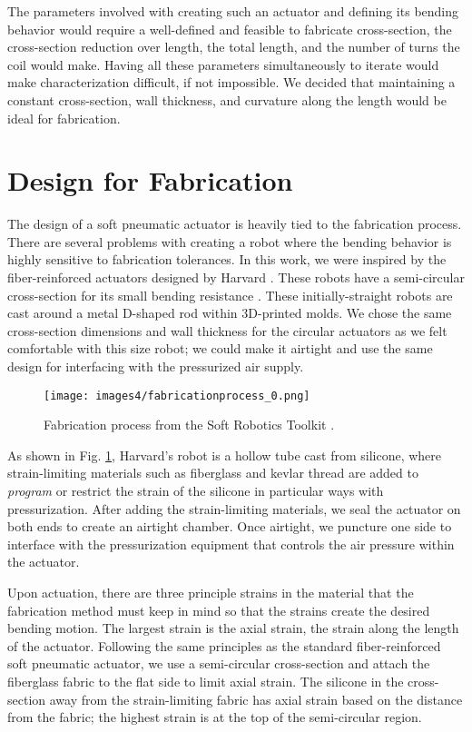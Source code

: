 The parameters involved with creating such an actuator and defining its bending behavior would require a well-defined and feasible to fabricate cross-section, the cross-section reduction over length, the total length, and the number of turns the coil would make. Having all these parameters simultaneously to iterate would make characterization difficult, if not impossible. We decided that maintaining a constant cross-section, wall thickness, and curvature along the length would be ideal for fabrication. 

\section{Design for Fabrication}

The design of a soft pneumatic actuator is heavily tied to the fabrication process. There are several problems with creating a robot where the bending behavior is highly sensitive to fabrication tolerances. In this work, we were inspired by the fiber-reinforced actuators designed by Harvard \cite{galloway_mechanically_2013}. These robots have a semi-circular cross-section for its small bending resistance \cite{polygerinos_modeling_2015}. These initially-straight robots are cast around a metal D-shaped rod within 3D-printed molds. We chose the same cross-section dimensions and wall thickness for the circular actuators as we felt comfortable with this size robot; we could make it airtight and use the same design for interfacing with the pressurized air supply. 

\begin{figure}[ht]
    \centering
    \texttt{[image: images4/fabricationprocess\_0.png]}
    \caption{Fabrication process from the Soft Robotics Toolkit \cite{galloway_mechanically_2013}.}
    \label{fig:toolkitfab}
\end{figure}

As shown in Fig. \ref{fig:toolkitfab}, Harvard's robot is a hollow tube cast from silicone, where strain-limiting materials such as fiberglass and kevlar thread are added to \emph{program} or restrict the strain of the silicone in particular ways with pressurization. After adding the strain-limiting materials, we seal the actuator on both ends to create an airtight chamber. Once airtight, we puncture one side to interface with the pressurization equipment that controls the air pressure within the actuator. 

Upon actuation, there are three principle strains in the material that the fabrication method must keep in mind so that the strains create the desired bending motion. The largest strain is the axial strain, the strain along the length of the actuator. Following the same principles as the standard fiber-reinforced soft pneumatic actuator, we use a semi-circular cross-section and attach the fiberglass fabric to the flat side to limit axial strain. The silicone in the cross-section away from the strain-limiting fabric has axial strain based on the distance from the fabric; the highest strain is at the top of the semi-circular region.  

